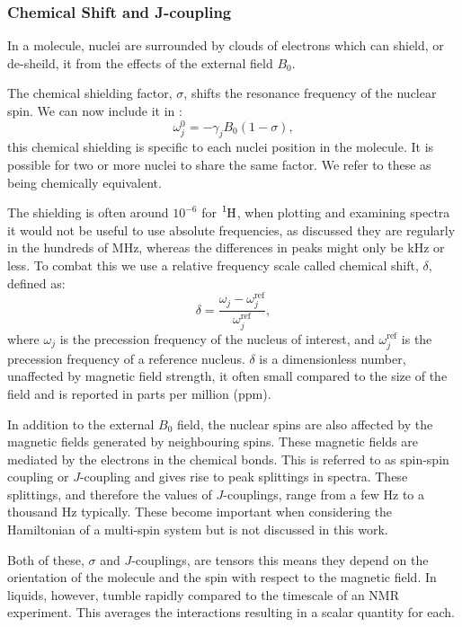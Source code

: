 \subsubsection{Chemical Shift and J-coupling}

In a molecule, nuclei are surrounded by clouds of electrons which can shield, or de-sheild, it
from the effects of the external field $B_0$.

The chemical shielding factor, $\sigma$, shifts the resonance frequency of the nuclear spin. We
can now include it in :
\begin{equation}
  \omega_j^0 = -\gamma_jB_0(1-\sigma),
\end{equation}
this chemical shielding is specific to each nuclei position in the molecule. It is possible
for two or more nuclei to share the same factor. We refer to these as being chemically equivalent.

The shielding is often around $10^{-6}$ for $\ce{^1H}$, when plotting and examining spectra
it would not be useful to use absolute frequencies, as discussed they are regularly in the hundreds of MHz,
whereas the differences in peaks might only be kHz or less. To combat this we use a relative frequency scale
called chemical shift, $\delta$, defined as:
\begin{equation}
  \delta = \frac{\omega_j-\omega^\text{ref}_j}{\omega^\text{ref}_j},
\end{equation}
where $\omega_j$ is the precession frequency of the nucleus of interest, and $\omega^\text{ref}_j$ is the precession
frequency of a reference nucleus. $\delta$ is a dimensionless number, unaffected by magnetic field strength, it often
small compared to the size of the field and is reported in parts per million (ppm).

In addition to the external $B_0$ field, the nuclear spins are also affected by the magnetic fields generated
by neighbouring spins. These magnetic fields are mediated by the electrons in the chemical bonds. This is referred to as
spin-spin coupling or $J$-coupling and gives rise to peak splittings in spectra. These splittings, and therefore the values
of $J$-couplings, range from a few Hz to a thousand Hz typically. These become important when considering the
Hamiltonian of a multi-spin system but is not discussed in this work.

Both of these, $\sigma$ and $J$-couplings, are tensors this means they depend on the orientation of the molecule
and the spin with respect to the magnetic field. In liquids, however, tumble rapidly compared to the timescale
of an NMR experiment. This averages the interactions resulting in a scalar quantity for each.

